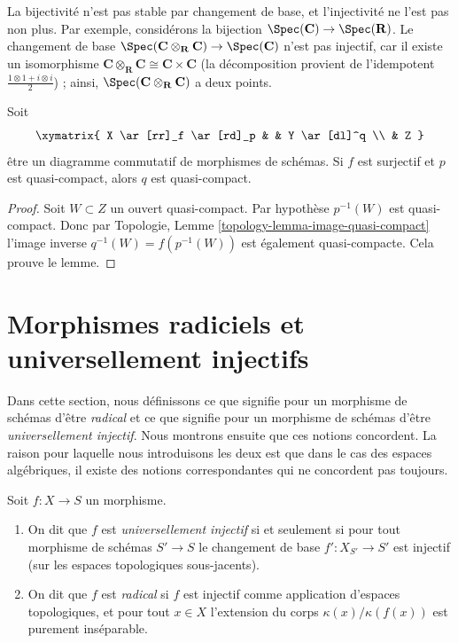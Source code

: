 \begin{example}
\label{example-injective-not-preserved-base-change}
La bijectivité n'est pas stable par changement
de base, et l'injectivité ne l'est
pas non plus. Par exemple, considérons
la bijection
$\Spec(\mathbf{C}) \to \Spec(\mathbf{R})$. Le changement de base
$\Spec(\mathbf{C} \otimes_{\mathbf{R}} \mathbf{C}) \to
\Spec(\mathbf{C})$ n'est pas injectif, car il existe un isomorphisme
$\mathbf{C} \otimes_{\mathbf{R}} \mathbf{C} \cong \mathbf{C} \times \mathbf{C}$
(la décomposition
provient de l'idempotent $\frac{1 \otimes 1 + i \otimes i}{2}$) ;
ainsi, $\Spec(\mathbf{C} \otimes_{\mathbf{R}} \mathbf{C})$ a deux points.
\end{example}

\begin{lemma}
\label{lemma-surjection-from-quasi-compact}
Soit
$$
\xymatrix{
X \ar[rr]_f \ar[rd]_p & &
Y \ar[dl]^q \\
& Z
}
$$
être un diagramme commutatif de morphismes de schémas. Si $f$
est surjectif et $p$ est quasi-compact, alors $q$ est quasi-compact.
\end{lemma}

\begin{proof}
Soit $W \subset Z$ un ouvert quasi-compact. Par hypothèse $p^{-1}(W)$
est quasi-compact.
Donc par Topologie, Lemme \ref{topology-lemma-image-quasi-compact} l'image
inverse $q^{-1}(W) = f(p^{-1}(W))$ est également quasi-compacte. Cela
prouve le lemme.
\end{proof}




\section{Morphismes radiciels et universellement injectifs}
\label{section-radicial}

\noindent
Dans cette section, nous définissons ce que signifie pour un morphisme de schémas d'être {\it
radical} et ce que signifie pour un morphisme de schémas d'être {\it
universellement injectif}. Nous montrons ensuite que ces notions
concordent. La raison pour laquelle nous introduisons les deux est que dans le cas des espaces algébriques,
il existe des notions correspondantes qui ne concordent pas toujours.

\begin{definition}
\label{definition-universally-injective}
Soit $f : X \to S$ un morphisme.
\begin{enumerate}
\item On dit que $f$ est {\it universellement injectif}
si et seulement si pour tout morphisme de schémas $S' \to S$ le changement
de base $f' : X_{S'} \to S'$ est injectif (sur les espaces topologiques sous-jacents).
\item On dit que $f$ est {\it radical} si $f$
est injectif comme application d'espaces topologiques, et pour tout
$x \in X$ l'extension du corps $\kappa(x)/\kappa(f(x))$ est purement inséparable.
\end{enumerate}
\end{definition}

